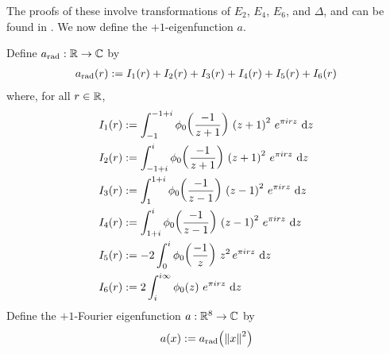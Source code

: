 The proofs of these involve transformations of $E_2$, $E_4$, $E_6$, and $\Delta$, and can be found in \cite{blueprint}. We now define the $+1$-eigenfunction $a$.

\begin{boxdefinition}\label{Ch4:Def:a}
    Define $a_{\operatorname{rad}} : \mathbb{R} \to \mathbb{C}$ by
    \begin{align}
        a_{\operatorname{rad}}\!\left( r \right) := I_1(r) + I_2(r) + I_3(r) + I_4(r) + I_5(r) + I_6(r)
            \label{Ch4:Eq:a_rad_def}
    \end{align}
    where, for all $r \in \mathbb{R}$,
    \begin{align}
        I_1(r) &:= \int_{-1}^{-1 + i} \phi_0\of{\frac{-1}{z+1}} \,
                                 \parenth{z + 1}^2 \,
                                 e^{\pi i r z} \,
                                 \diff{z}
            \label{Ch4:Eq:I_1_def} \\
        I_2(r) &:= \int_{-1 + i}^{i} \phi_0\of{\frac{-1}{z+1}} \,
                                 \parenth{z + 1}^2 \,
                                 e^{\pi i r z} \,
                                 \diff{z}
            \label{Ch4:Eq:I_2_def} \\
        I_3(r) &:= \int_{1}^{1 + i} \phi_0\of{\frac{-1}{z - 1}} \,
                                \parenth{z - 1}^2 \,
                                e^{\pi i r z} \,
                                \diff{z}
            \label{Ch4:Eq:I_3_def} \\
        I_4(r) &:= \int_{1 + i}^{i} \phi_0\of{\frac{-1}{z - 1}} \,
                                \parenth{z - 1}^2 \,
                                e^{\pi i r z} \,
                                \diff{z}
            \label{Ch4:Eq:I_4_def} \\
        I_5(r) &:= -2 \int_{0}^{i} \phi_0\of{\frac{-1}{z}} \,
                                z^2 \,
                                e^{\pi i r z} \,
                                \diff{z}
            \label{Ch4:Eq:I_5_def} \\
        I_6(r) &:= 2 \int_{i}^{i \infty} \phi_0\of{z} \,
                                e^{\pi i r z} \,
                                \diff{z}
            \label{Ch4:Eq:I_6_def}
    \end{align}
    Define the $+1$-Fourier eigenfunction $a : \mathbb{R}^8 \to \mathbb{C}$ by
    \begin{align}
        a(x) := a_{\operatorname{rad}}\!\left( \left\lVert x \right\rVert^2 \right)
            \label{Ch4:Eq:a_def}
    \end{align}
\end{boxdefinition}

